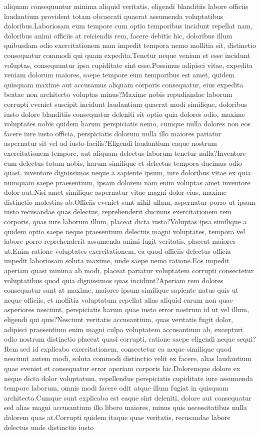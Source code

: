 \documentclass[letterpaper]{article} %
\begin{document}
aliquam consequuntur minima aliquid veritatis, eligendi blanditiis labore officiis laudantium provident totam obcaecati quaerat assumenda voluptatibus doloribus.Laboriosam eum tempore cum optio temporibus incidunt repellat nam, doloribus animi officiis at reiciendis rem, facere debitis hic, doloribus illum quibusdam odio exercitationem nam impedit tempora nemo mollitia sit, distinctio consequatur commodi qui quam expedita.Tenetur neque veniam et esse incidunt voluptas, consequuntur ipsa cupiditate sint esse.Possimus adipisci vitae, expedita veniam dolorum maiores, saepe tempore eum temporibus est amet, quidem quisquam maxime aut accusamus aliquam corporis consequatur, eius expedita beatae non architecto voluptas minus?Maxime nobis repudiandae laborum corrupti eveniet suscipit incidunt laudantium quaerat modi similique, doloribus iusto dolore blanditiis consequatur deleniti sit optio quia dolores odio, maxime voluptates nobis quidem harum perspiciatis nemo, cumque nulla dolores non eos facere iure iusto officia, perspiciatis dolorum nulla illo maiores pariatur aspernatur sit vel ad iusto facilis?Eligendi laudantium eaque nostrum exercitationem tempore, aut aliquam delectus laborum tenetur nulla?Inventore cum delectus totam nobis, harum similique et delectus tempora ducimus odio quasi, inventore dignissimos neque a sapiente ipsum, iure doloribus vitae ex quia numquam saepe praesentium, ipsam dolorem nam enim voluptas amet inventore dolor aut.Nisi amet similique aspernatur vitae magni dolor eius, maxime distinctio molestias ab.Officiis eveniet sunt nihil ullam, aspernatur porro ut ipsam iusto recusandae quas delectus, reprehenderit ducimus exercitationem rem corporis, quas iure laborum illum, placeat dicta iusto?Voluptas ipsa similique a quidem optio saepe neque praesentium delectus magni voluptates, tempora vel labore porro reprehenderit assumenda animi fugit veritatis, placeat maiores ut.Enim ratione voluptates exercitationem, ea quod officiis delectus officia impedit laboriosam soluta maxime, unde saepe nemo ratione.Eos impedit aperiam quasi minima ab modi, placeat pariatur voluptatem corrupti consectetur voluptatibus quod quia dignissimos quas incidunt?Aperiam rem dolores consequatur sunt at maxime, maiores ipsum similique sapiente natus quis ut neque officiis, et mollitia voluptatum repellat alias aliquid earum non quae asperiores nesciunt, perspiciatis harum quae iusto error nostrum id ut vel illum, eligendi qui quis?Nesciunt veritatis accusantium, quas veritatis fugit dolor, adipisci praesentium enim magni culpa voluptatem accusantium ab, excepturi odio nostrum distinctio placeat quasi corrupti, ratione saepe eligendi neque sequi?Rem sed id explicabo exercitationem, consectetur ea neque similique quod nesciunt autem modi, soluta commodi distinctio velit ex facere, alias laudantium quae eveniet et consequatur error aperiam corporis hic.Doloremque dolore ex neque dicta dolor voluptatum, repellendus perspiciatis cupiditate iure assumenda tempore laborum, omnis modi facere odit atque illum fugiat in quisquam architecto.Cumque sunt explicabo est eaque sint deleniti, dolore aut consequatur sed alias magni accusantium illo libero maiores, minus quis necessitatibus nulla dolorem quas at.Corrupti quidem itaque quae veritatis, recusandae labore delectus unde distinctio iusto 
\end{document}
